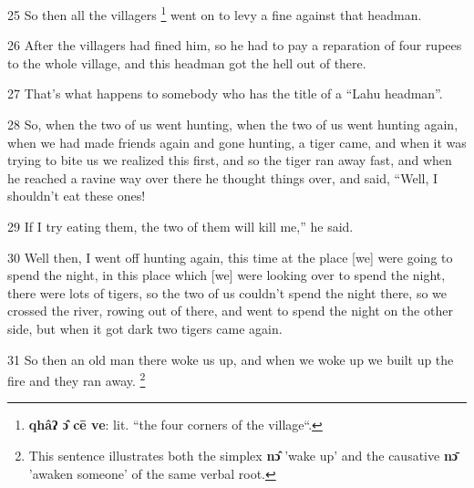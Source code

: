 25 So then all the villagers \footnote{\textbf{qhâʔ ɔ̂ cē ve}: lit. ``the four corners of the village``.} went on to levy a fine against that headman.

26 After the villagers had fined him, so he had to pay a reparation of four rupees
to the whole village, and this headman got the hell out of there.

27 That's what happens to somebody who has the title of a ``Lahu headman''.

28 So, when the two of us went hunting, when the two of us went hunting again,
when we had made friends again and gone hunting, a tiger came, and when it was
trying to bite us we realized this first, and so the tiger ran away fast, and when
he reached a ravine way over there he thought things over, and said, ``Well, I
shouldn't eat these ones!

29 If I try eating them, the two of them will kill me,'' he said.

30 Well then, I went off hunting again, this time at the place [we] were going
to spend the night, in this place which [we] were looking over to spend the night,
there were lots of tigers, so the two of us couldn't spend the night there, so
we crossed the river, rowing out of there, and went to spend the night on the other
side, but when it got dark two tigers came again.

31 So then an old man there woke us up, and when we woke up we built up the fire
and they ran away. \footnote{This sentence illustrates both the simplex \textbf{nɔ̂} 'wake up' and the causative \textbf{nɔ̄} 'awaken someone' of the same verbal root.}

